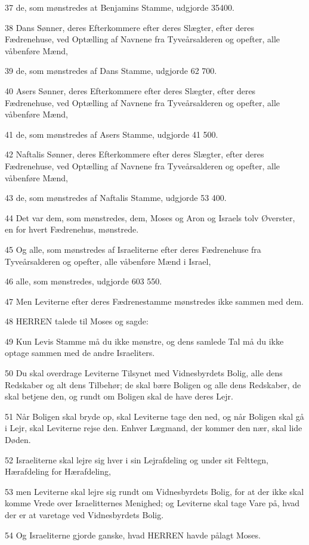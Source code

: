 \par 37 de, som mønstredes at Benjamins Stamme, udgjorde 35400.
\par 38 Dans Sønner, deres Efterkommere efter deres Slægter, efter deres Fædrenehuse, ved Optælling af Navnene fra Tyveårsalderen og opefter, alle våbenføre Mænd,
\par 39 de, som mønstredes af Dans Stamme, udgjorde 62 700.
\par 40 Asers Sønner, deres Efterkommere efter deres Slægter, efter deres Fædrenehuse, ved Optælling af Navnene fra Tyveårsalderen og opefter, alle våbenføre Mænd,
\par 41 de, som mønstredes af Asers Stamme, udgjorde 41 500.
\par 42 Naftalis Sønner, deres Efterkommere efter deres Slægter, efter deres Fædrenehuse, ved Optælling af Navnene fra Tyveårsalderen og opefter, alle våbenføre Mænd,
\par 43 de, som mønstredes af Naftalis Stamme, udgjorde 53 400.
\par 44 Det var dem, som mønstredes, dem, Moses og Aron og Israels tolv Øverster, en for hvert Fædrenehus, mønstrede.
\par 45 Og alle, som mønstredes af Israeliterne efter deres Fædrenehuse fra Tyveårsalderen og opefter, alle våbenføre Mænd i Israel,
\par 46 alle, som mønstredes, udgjorde 603 550.
\par 47 Men Leviterne efter deres Fædrenestamme mønstredes ikke sammen med dem.
\par 48 HERREN talede til Moses og sagde:
\par 49 Kun Levis Stamme må du ikke mønstre, og dens samlede Tal må du ikke optage sammen med de andre Israeliters.
\par 50 Du skal overdrage Leviterne Tilsynet med Vidnesbyrdets Bolig, alle dens Redskaber og alt dens Tilbehør; de skal bære Boligen og alle dens Redskaber, de skal betjene den, og rundt om Boligen skal de have deres Lejr.
\par 51 Når Boligen skal bryde op, skal Leviterne tage den ned, og når Boligen skal gå i Lejr, skal Leviterne rejse den. Enhver Lægmand, der kommer den nær, skal lide Døden.
\par 52 Israeliterne skal lejre sig hver i sin Lejrafdeling og under sit Felttegn, Hærafdeling for Hærafdeling,
\par 53 men Leviterne skal lejre sig rundt om Vidnesbyrdets Bolig, for at der ikke skal komme Vrede over Israelitternes Menighed; og Leviterne skal tage Vare på, hvad der er at varetage ved Vidnesbyrdets Bolig.
\par 54 Og Israeliterne gjorde ganske, hvad HERREN havde pålagt Moses.

